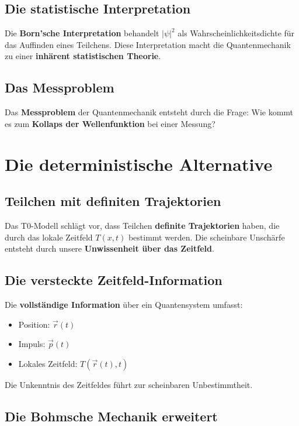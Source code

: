 \documentclass[12pt,a4paper]{report}
\begin{document}
	\subsection{Die statistische Interpretation}
	
	Die \textbf{Born'sche Interpretation} behandelt $|\psi|^2$ als Wahrscheinlichkeitsdichte für das Auffinden eines Teilchens. Diese Interpretation macht die Quantenmechanik zu einer \textbf{inhärent statistischen Theorie}.
	
	\subsection{Das Messproblem}
	
	Das \textbf{Messproblem} der Quantenmechanik entsteht durch die Frage: Wie kommt es zum \textbf{Kollaps der Wellenfunktion} bei einer Messung?
	
	\section{Die deterministische Alternative}
	
	\subsection{Teilchen mit definiten Trajektorien}
	
	Das T0-Modell schlägt vor, dass Teilchen \textbf{definite Trajektorien} haben, die durch das lokale Zeitfeld $T(x,t)$ bestimmt werden. Die scheinbare Unschärfe entsteht durch unsere \textbf{Unwissenheit über das Zeitfeld}.
	
	\subsection{Die versteckte Zeitfeld-Information}
	
	Die \textbf{vollständige Information} über ein Quantensystem umfasst:
	\begin{itemize}
		\item Position: $\vec{r}(t)$
		\item Impuls: $\vec{p}(t)$
		\item Lokales Zeitfeld: $T(\vec{r}(t),t)$
	\end{itemize}
	
	Die Unkenntnis des Zeitfeldes führt zur scheinbaren Unbestimmtheit.
	
	\subsection{Die Bohmsche Mechanik erweitert}
	
\end{document}
